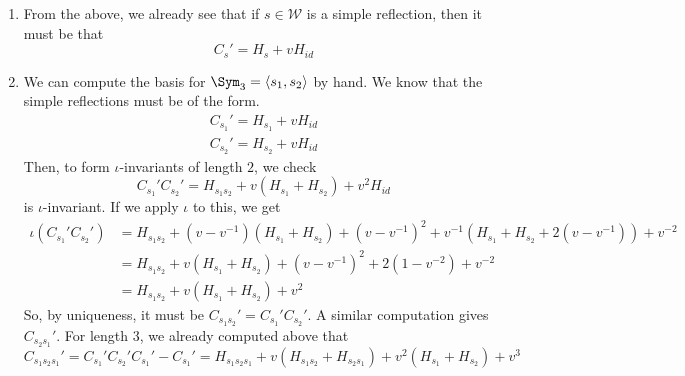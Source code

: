 \documentclass[11pt,leqno,oneside]{amsart}
\numberwithin{thm}{section}
\renewcommand{\W}{\mathcal{W}}
\begin{document}
\begin{example}
  \begin{enumerate}
  \item From the above, we already see that if \(s \in \W\) is a simple
    reflection, then it must be that \[
      C_s' = H_s+v H_{id}
    \]
  \item We can compute the basis for \(\Sym_3 = \langle s_1, s_2
    \rangle\) by hand. We know that the simple reflections must be of
    the form.
    \begin{align*}
      C_{s_1}' = H_{s_1} +vH_{id}\\
      C_{s_2}' = H_{s_2}+vH_{id}
    \end{align*}
    Then, to form \(\iota\)-invariants of length \(2\), we check \[
      C_{s_1}' C_{s_2}' = H_{s_1 s_2} + v(H_{s_1}+H_{s_2}) + v^2 H_{id}
    \]
    is \(\iota\)-invariant. If we apply \(\iota\) to this, we get
    \begin{align*}
      \iota (C_{s_1}' C_{s_2}')
      & = H_{s_1 s_2}+(v-v^{-1})(H_{s_1} + H_{s_2})+(v-v^{-1})^2 +
        v^{-1}(H_{s_1} + H_{s_2}+2(v-v^{-1})) + v^{-2} \\
      & = H_{s_1 s_2} + v(H_{s_1}+H_{s_2}) + (v-v^{-1})^2 +
        2(1-v^{-2}) + v^{-2} \\
      & = H_{s_1 s_2} + v(H_{s_1}+H_{s_2}) + v^2
    \end{align*}
    So, by uniqueness, it must be \(C_{s_1 s_2}' = C_{s_1}'
    C_{s_2}'\). A similar computation gives \(C_{s_2 s_1}'\). For
    length \(3\), we already computed above that \[
      C_{s_1 s_2 s_1}' = C_{s_1}' C_{s_2}' C_{s_1}' - C_{s_1}' =
      H_{s_1 s_2 s_1} + v(H_{s_1 s_2} + H_{s_2 s_1}) +
      v^2(H_{s_1}+H_{s_2}) + v^3
    \]
  \end{enumerate}
\end{example}
\end{document}
